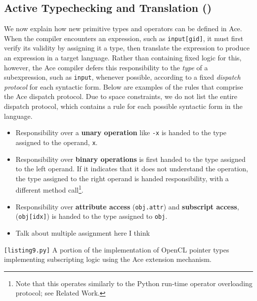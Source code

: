 \documentclass{sig-alternate}
\begin{document}
\subsection{Active Typechecking and Translation (\ATT)}
We now explain how new primitive types and operators can be defined in Ace. When the compiler encounters an expression, such as \verb|input[gid]|, it must first verify its validity by assigning it a type, then translate the expression to produce an expression in a target language. Rather than containing fixed logic for this, however, the Ace compiler defers this responsibility to the {\it type} of a subexpression, such as \verb|input|, whenever possible, according to a fixed {\em dispatch protocol} for each syntactic form. Below are examples of the rules that comprise the Ace dispatch protocol. Due to space constraints, we do not list the entire dispatch protocol, which contains a rule for each possible syntactic form in the language.
\begin{itemize}
\item Responsibility over a {\bf unary operation} like \verb|-x| is handed to the type assigned to the operand, \verb|x|.
\item Responsibility over {\bf binary operations} is first handed to the type assigned to the left operand. If it indicates that it does not understand the operation, the type assigned to the right operand is handed responsibility, with a different method call\footnote{Note that this operates similarly to the Python run-time operator overloading protocol; see Related Work.}.
\item Responsibility over {\bf attribute access} (\texttt{obj.attr}) and {\bf subscript access}, (\texttt{obj[idx]}) is handed to the type assigned to \texttt{obj}.
\item {\color{red} Talk about multiple assignment here I think}
\end{itemize}
\begin{codelisting}

\caption{\texttt{[listing9.py]} A portion of the implementation of OpenCL pointer types implementing subscripting logic using the Ace extension mechanism.}
\label{pointers}
\end{codelisting}
\end{document}
